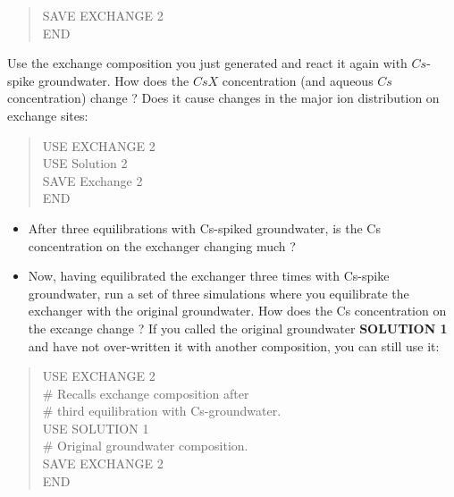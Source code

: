 \begin{quote}
{\color{red}SAVE EXCHANGE 2 \\
END }\\
\end{quote}

Use the exchange composition you just generated and react it again with $Cs$-spike groundwater.  
How does the $CsX$ concentration (and aqueous $Cs$ concentration) change ?  
Does it cause changes in the major ion distribution on exchange sites:

\begin{quote}
{\color{red}USE EXCHANGE 2 \\
USE Solution 2 \\
SAVE Exchange 2 \\
END }\\
\end{quote}

\begin{itemize}
\item After three equilibrations with Cs-spiked groundwater, 
is the Cs concentration on the exchanger changing much ?

\item Now, having equilibrated the exchanger three times with Cs-spike groundwater, 
run a set of three simulations where you equilibrate the exchanger with the original groundwater.  
How does the Cs concentration on the excange change ?  
If you called the original groundwater {\color{red}\textbf{SOLUTION 1}} 
and have not over-written it with another composition, you can still use it:
\end{itemize}

\begin{quote}
{\color{red}USE EXCHANGE 2 \\
\# Recalls exchange composition after \\
\# third equilibration with Cs-groundwater. \\
USE SOLUTION 1 \\
\# Original groundwater composition. \\
SAVE EXCHANGE 2 \\
END }\\
\end{quote}



